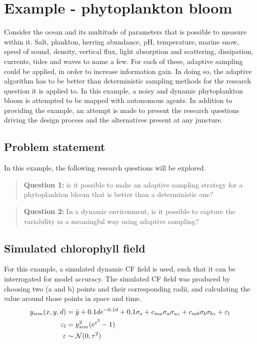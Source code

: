 \chapter{Example - phytoplankton bloom}
Consider the ocean and its multitude of parameters that is possible to measure within it. Salt, plankton, herring abundance, pH, temperature, marine snow, speed of sound, density, vertical flux, light absorption and scattering, dissipation, currents, tides and waves to name a few. For each of these, adaptive sampling could be applied, in order to increase information gain. In doing so, the adaptive algorithm has to be better than deterministic sampling methods for the research question it is applied to. In this example, a noisy and dynamic phytoplankton bloom is attempted to be mapped with autonomous agents. In addition to providing the example, an attempt is made to present the research questions driving the design process and the alternatives present at any juncture. 



\section{Problem statement}
In this example, the following research questions will be explored. 
\begin{quote}
    \textbf{Question 1:} is it possible to make an adaptive sampling strategy for a phytoplankton bloom that is better than a deterministic one? 
\end{quote}

\begin{quote}
    \textbf{Question 2:} In a dynamic environment, is it possible to capture the variability in a meaningful way using adaptive sampling? 
\end{quote}

\section{Simulated chlorophyll field}
For this example, a simulated dynamic CF field is used, such that it can be interrogated for model accuracy. The simulated CF field was produced by choosing two (a and b) points and their corresponding radii, and calculating the value around those points in space and time. 
\begin{align}
        y_{sim} (x,y,d) &= \Bar{y} + 0.1 d e^{-0.1d} + 0.1\sigma_s  + c_{ma}\sigma_a \sigma_{az} +  c_{mb} \sigma_b \sigma_{bz} + \varepsilon_l \\
        \varepsilon_l &= y_{sim}^2 (e^{\varepsilon^2}-1) \\
        \varepsilon &\sim \mathcal{N}(0,\tau^2)
\end{align}


